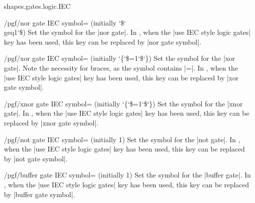 \begin{pgflibrary}{shapes.gates.logic.IEC}
    \begin{key}{/pgf/nor gate IEC symbol= (initially \char`\$\char`\\geq1\char`\$)}
        Set the symbol for the |nor gate|. In \tikzname, when the
        |use IEC style logic gates| key has been used, this key can be replaced
        by |nor gate symbol|.
    \end{key}

    \begin{key}{/pgf/xor gate IEC symbol= (initially \char`\{\char`\$=1\char`\$\char`\})}
        Set the symbol for the |xor gate|. Note the necessity for braces, as
        the symbol contains |=|. In \tikzname, when the
        |use IEC style logic gates| key has been used, this key can be replaced
        by |xor gate symbol|.
    \end{key}

    \begin{key}{/pgf/xnor gate IEC symbol= (initially  \char`\{\char`\$=1\char`\$\char`\})}
        Set the symbol for the |xnor gate|. In \tikzname, when the
        |use IEC style logic gates| key has been used, this key can be replaced
        by |xnor gate symbol|.
    \end{key}

    \begin{key}{/pgf/not gate IEC symbol= (initially 1)}
        Set the symbol for the |not gate|. In \tikzname, when the
        |use IEC style logic gates| key has been used, this key can be replaced
        by |not gate symbol|.
    \end{key}

    \begin{key}{/pgf/buffer gate IEC symbol= (initially 1)}
        Set the symbol for the |buffer gate|. In \tikzname, when the
        |use IEC style logic gates| key has been used, this key can be replaced
        by |buffer gate symbol|.
    \end{key}


\end{pgflibrary}
